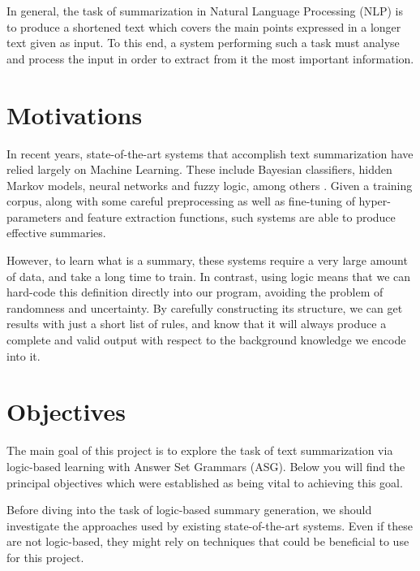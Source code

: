\label{chapter:introduction}

In general, the task of summarization in Natural Language Processing (NLP) is to produce a shortened text which covers the main points expressed in a longer text given as input. To this end, a system performing such a task must analyse and process the input in order to extract from it the most important information.

\section{Motivations}

In recent years, state-of-the-art systems that accomplish text summarization have relied largely on Machine Learning. These include Bayesian classifiers, hidden Markov models, neural networks and fuzzy logic, among others \cite{kiyani_survey_2017}. Given a training corpus, along with some careful preprocessing as well as fine-tuning of hyper-parameters and feature extraction functions, such systems are able to produce effective summaries. 

However, to learn what is a summary, these systems require a very large amount of data, and take a long time to train. In contrast, using logic means that we can hard-code this definition directly into our program, avoiding the problem of randomness and uncertainty. By carefully constructing its structure, we can get results with just a short list of rules, and know that it will always produce a complete and valid output with respect to the background knowledge we encode into it.

\section{Objectives}

The main goal of this project is to explore the task of text summarization via logic-based learning with Answer Set Grammars (ASG). Below you will find the principal objectives which were established as being vital to achieving this goal.

\begin{objective}
Before diving into the task of logic-based summary generation, we should investigate the approaches used by existing state-of-the-art systems. Even if these are not logic-based, they might rely on techniques that could be beneficial to use for this project.
\end{objective}

